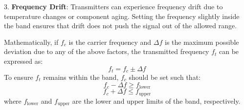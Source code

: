 3. \textbf{Frequency Drift}: Transmitters can experience frequency drift due to temperature changes or component aging. Setting the frequency slightly inside the band ensures that drift does not push the signal out of the allowed range.

Mathematically, if \( f_c \) is the carrier frequency and \( \Delta f \) is the maximum possible deviation due to any of the above factors, the transmitted frequency \( f_t \) can be expressed as:
\[ f_t = f_c \pm \Delta f \]
To ensure \( f_t \) remains within the band, \( f_c \) should be set such that:
\[ f_c - \Delta f \geq f_{\text{lower}} \]
\[ f_c + \Delta f \leq f_{\text{upper}} \]
where \( f_{\text{lower}} \) and \( f_{\text{upper}} \) are the lower and upper limits of the band, respectively.

